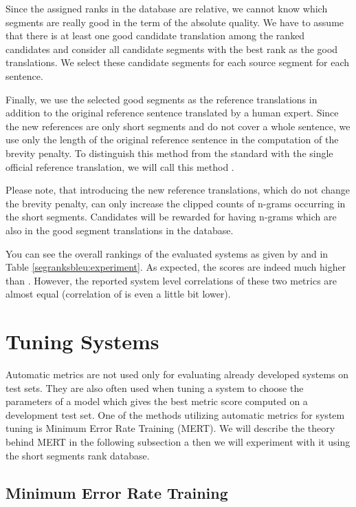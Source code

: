 Since the assigned ranks in the database are relative, we cannot know which
segments are really good in the term of the absolute quality. We have to assume
that there is at least one good candidate translation among the ranked
candidates and consider all candidate segments with the best rank as the good
translations. We select these candidate segments for each source segment for
each sentence.

Finally, we use the selected good segments as the reference translations in
addition to the original reference sentence translated by a human expert.  Since
the new references are only short segments and do not cover a whole sentence,
we use only the length of the original reference sentence in the computation of
the brevity penalty. To distinguish this method from the standard 
with the single official reference translation, we will call this method
.

Please note, that introducing the new reference
translations, which do not change the brevity penalty, can only increase the
clipped counts of n-grams occurring in the short segments.  Candidates will be
rewarded for having n-grams which are also in the good segment translations in
the database.

You can see the overall rankings of the evaluated systems as given by
 and  in Table
\ref{segranksbleu:experiment}. As expected, the  scores
are indeed much higher than . However, the reported system level
correlations of these two metrics are almost equal (correlation of
 is even a little bit lower).  


\section{Tuning Systems}
\label{tuning-systems}

Automatic metrics are not used only for evaluating already developed systems on
test sets. They are also often used when tuning a system to choose the
parameters of a model which gives the best metric score computed on a
development test set. One of the methods utilizing automatic metrics for system
tuning is Minimum Error Rate Training (MERT). We will describe the theory
behind MERT in the following subsection a then we will experiment with it using
the short segments rank database.

\subsection{Minimum Error Rate Training}

